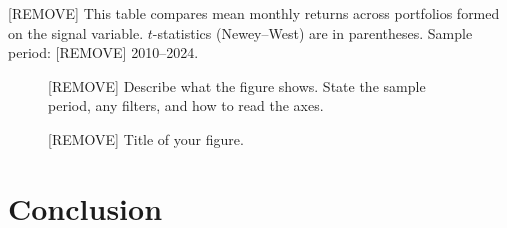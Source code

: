 \documentclass[12pt]{article}
\begin{document}
\begin{table}[!ht]
\caption{[REMOVE] Comparison of Portfolio Returns (\%).}
{\footnotesize
[REMOVE] This table compares mean monthly returns across portfolios
formed on the signal variable. $t$-statistics (Newey--West) are in
parentheses. Sample period: [REMOVE] 2010--2024.}
\vspace{2mm}
\begin{center}
\label{tab:comparison}
\end{center}
\end{table}

\begin{figure}[h!]
\begin{center}
\fbox{\rule{0pt}{4cm}\rule{0.95\textwidth}{0pt}}
\end{center}
\vspace{-4mm}
\caption{[REMOVE] Title of your figure.}
{\footnotesize
[REMOVE] Describe what the figure shows. State the sample period, any
filters, and how to read the axes.}
\label{fig:example}
\end{figure}




\section{Conclusion}\label{sec:conclusion}
\end{document}
